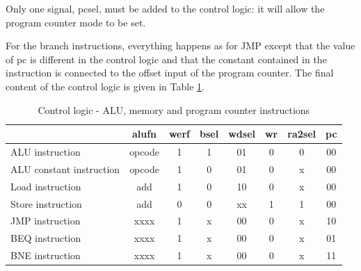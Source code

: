 Only one signal, pcsel, must be added to the control logic: it will allow the program 
counter mode to be set.

For the branch instructions, everything happens as for JMP except that the value of pc is different 
in the control logic and that the constant contained in the instruction is connected to the offset 
input of the program counter. The final content of the control logic is given in Table \ref{tab:cl/all}.

\begin{table}[H]
    \centering
    \begin{tabular}{|l|c|c|c|c|c|c|c|}
    \hline
    \rowcolor[HTML]{DAE8FC} 
    \multicolumn{1}{|c|}{\cellcolor[HTML]{DAE8FC}\textbf{Instruction}} & \textbf{alufn} & \textbf{werf} & \textbf{bsel} & \textbf{wdsel} & \textbf{wr} & \textbf{ra2sel} & \textbf{pc} \\ \hline
    ALU instruction                                                    & opcode         & 1             & 1             & 01             & 0           & 0               & 00          \\ \hline
    ALU constant instruction                                           & opcode         & 1             & 0             & 01             & 0           & x               & 00          \\ \hline
    Load instruction                                                   & add            & 1             & 0             & 10             & 0           & x               & 00          \\ \hline
    Store instruction                                                  & add            & 0             & 0             & xx             & 1           & 1               & 00          \\ \hline
    JMP instruction                                                    & xxxx           & 1             & x             & 00             & 0           & x               & 10          \\ \hline
    BEQ instruction                                                    & xxxx           & 1             & x             & 00             & 0           & x               & 01          \\ \hline
    BNE instruction                                                    & xxxx           & 1             & x             & 00             & 0           & x               & 11          \\ \hline
    \end{tabular}
    \caption{Control logic - ALU, memory and program counter instructions}
    \label{tab:cl/all}
\end{table}

